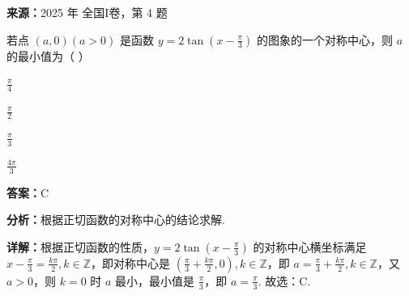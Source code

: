 \begin{question}[points=5]
\textbf{来源：}2025 年 全国I卷，第 4 题\par
若点 $(a,0)(a>0)$ 是函数 $y = 2\tan\left(x - \frac{\pi}{3}\right)$ 的图象的一个对称中心，则 $a$ 的最小值为（ ）
\begin{choices}
  \item $\frac{\pi}{4}$
  \item $\frac{\pi}{2}$
  \item $\frac{\pi}{3}$
  \item $\frac{4\pi}{3}$
\end{choices}
\begin{solution}
\textbf{答案：}C

\textbf{分析：}根据正切函数的对称中心的结论求解.

\textbf{详解：}根据正切函数的性质，$y = 2\tan\left(x - \frac{\pi}{3}\right)$ 的对称中心横坐标满足 $x - \frac{\pi}{3} = \frac{k\pi}{2}, k \in \mathbb{Z}$，即对称中心是 $\left(\frac{\pi}{3} + \frac{k\pi}{2}, 0\right), k \in \mathbb{Z}$，即 $a = \frac{\pi}{3} + \frac{k\pi}{2}, k \in \mathbb{Z}$，又 $a>0$，则 $k=0$ 时 $a$ 最小，最小值是 $\frac{\pi}{3}$，即 $a = \frac{\pi}{3}$. 故选：C.
\end{solution}
\end{question}

